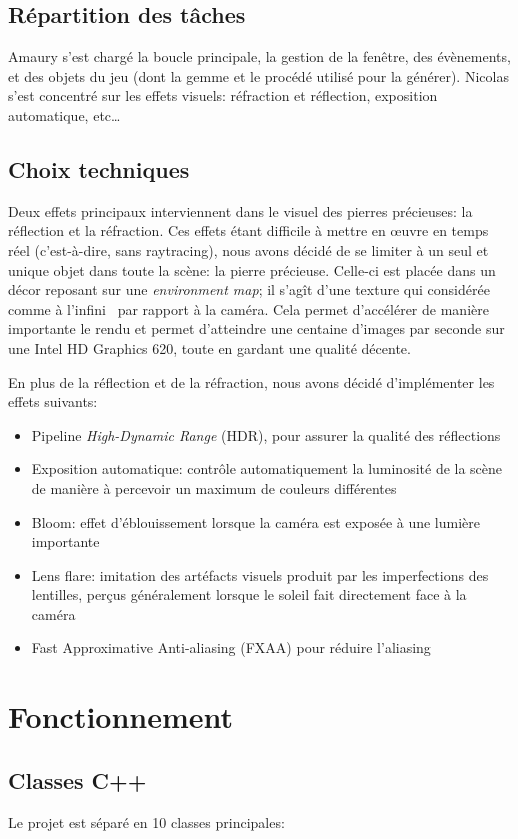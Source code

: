 \documentclass[a4paper,12pt]{article}
\begin{document}
\subsection{Répartition des tâches}
Amaury s'est chargé la boucle principale, la gestion de la fenêtre, des évènements, et des objets du jeu
(dont la gemme et le procédé utilisé pour la générer). Nicolas s'est concentré sur les effets visuels: réfraction et réflection,
exposition automatique, etc\ldots

\subsection{Choix techniques}
Deux effets principaux interviennent dans le visuel des pierres précieuses: la réflection et la réfraction.
Ces effets étant difficile à mettre en œuvre en temps réel (c'est-à-dire, sans raytracing), nous avons décidé
de se limiter à un seul et unique objet dans toute la scène: la pierre précieuse. Celle-ci est placée dans un
décor reposant sur une \emph{environment map}; il s'agît d'une texture qui considérée comme \og à l'infini \fg
\ par rapport à la caméra. Cela permet d'accélérer de manière importante le rendu et permet d'atteindre une
centaine d'images par seconde sur une Intel HD Graphics 620, toute en gardant une qualité décente.

En plus de la réflection et de la réfraction, nous avons décidé d'implémenter les effets suivants:
\begin{itemize}
    \item Pipeline \emph{High-Dynamic Range} (HDR), pour assurer la qualité des réflections
    \item Exposition automatique: contrôle automatiquement la luminosité de la scène de manière à percevoir un maximum de couleurs différentes
    \item Bloom: effet d'éblouissement lorsque la caméra est exposée à une lumière importante
    \item Lens flare: imitation des artéfacts visuels produit par les imperfections des lentilles, perçus généralement lorsque le soleil fait directement face à la caméra
    \item Fast Approximative Anti-aliasing (FXAA) pour réduire \og l'aliasing \fg
\end{itemize}

\section{Fonctionnement}
\subsection{Classes C++}
Le projet est séparé en 10 classes principales:
\end{document}
